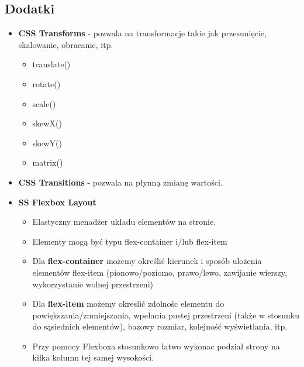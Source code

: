 \documentclass[../main.tex]{subfiles}
\begin{document}
    \subsection{Dodatki}
    \begin{itemize}
        \item \textbf{CSS Transforms} - pozwala na transformacje takie jak przesunięcie, skalowanie, obracanie, itp.
        \begin{itemize}
            \item translate()
            \item rotate()
            \item scale()
            \item skewX()
            \item skewY()
            \item matrix()
        \end{itemize}

        \item \textbf{CSS Transitions} - pozwala na płynną zmianę wartości.

        \item \textbf{SS Flexbox Layout}
        \begin{itemize}
            \item Elastyczny menadżer układu elementów na stronie.
            \item Elementy mogą być typu flex-container i/lub flex-item
            \item Dla \textbf{flex-container} możemy określić kierunek i sposób ulożenia elementów flex-item (pionowo/poziomo, prawo/lewo, zawijanie wierszy, wykorzystanie wolnej przestrzeni)
            \item Dla \textbf{flex-item} możemy okreslić zdolnośc elementu do powiększania/zmniejszania, wpełania pustej przestrzeni (także w stosunku do sąsiednich elementów), bazowy rozmiar, kolejność wyświetlania, itp.
            \item Przy pomocy Flexboxa stosunkowo łatwo wykonac podział strony na kilka kolumn tej samej wysokości.
        \end{itemize}
    \end{itemize}
\end{document}
